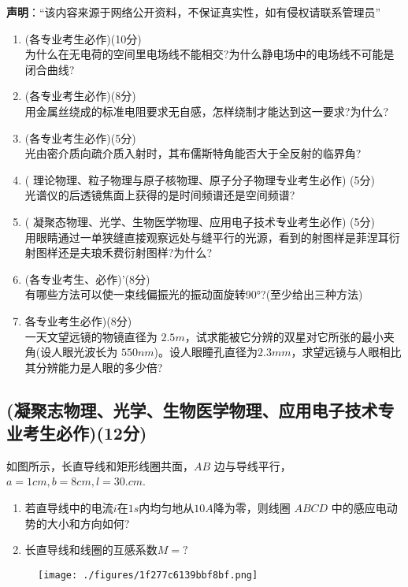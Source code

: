 
\textbf{声明}：“该内容来源于网络公开资料，不保证真实性，如有侵权请联系管理员”

\begin{enumerate}
\item (各专业考生必作)(10分)\\
为什么在无电荷的空间里电场线不能相交?为什么静电场中的电场线不可能是闭合曲线?
\item (各专业考生必作)(8分)\\
用金属丝绕成的标准电阻要求无自感，怎样绕制才能达到这一要求?为什么?
\item (各专业考生必作)(5分)\\
光由密介质向疏介质入射时，其布儒斯特角能否大于全反射的临界角?
\item ( 理论物理、粒子物理与原子核物理、原子分子物理专业考生必作)
(5分)\\
光谱仪的后透镜焦面上获得的是时间频谱还是空间频谱?
\item ( 凝聚态物理、光学、生物医学物理、应用电子技术专业考生必作)
(5分)\\
用眼睛通过一单狭缝直接观察远处与缝平行的光源，看到的射图样是菲涅耳衍射图样还是夫琅禾费衍射图样?为什么?
\item (各专业考生、必作)'(8分)\\
有哪些方法可以使一束线偏振光的振动面旋转90°?(至少给出三种方法)
\item 各专业考生必作)(8分)\\
一天文望远镜的物镜直径为 $2.5m$，试求能被它分辨的双星对它所张的最小夹角(设人眼光波长为 $550nm$)。设人眼瞳孔直径为$2.3mm$，求望远镜与人眼相比其分辨能力是人眼的多少倍?
\end{enumerate}
\subsection{(凝聚志物理、光学、生物医学物理、应用电子技术专业考生必作)(12分)}
如图所示，长直导线和矩形线圈共面，$AB$ 边与导线平行，$a=1cm,b=8cm,l=30.cm$.
\begin{enumerate}
\item 若直导线中的电流$i$在$1s$内均匀地从$10A$降为零，则线圈 $ABCD$ 中的感应电动势的大小和方向如何?
\item 长直导线和线圈的互感系数$M=?$
\end{enumerate}
\begin{figure}[ht]
\centering
\texttt{[image: ./figures/1f277c6139bbf8bf.png]}
\caption{} \label{fig_CD07_1}
\end{figure}
